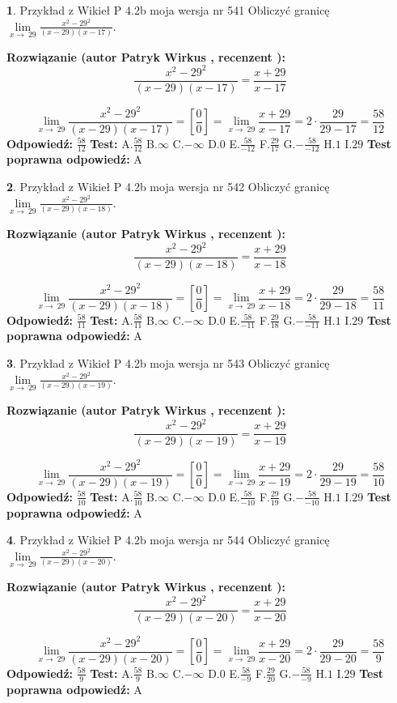 \documentclass[12pt, a4paper]{article}
\theoremstyle{definition} %
\newtheorem{zad}{}
\newcommand{\zadStart}[1]{\begin{zad}#1\newline}
\newcommand{\zadStop}{\end{zad}}
\newcommand{\rozwStart}[2]{\noindent \textbf{Rozwiązanie (autor #1 , recenzent #2): }\newline}
\newcommand{\rozwStop}{\newline}
\newcommand{\odpStart}{\noindent \textbf{Odpowiedź:}\newline}
\newcommand{\odpStop}{\newline}
\newcommand{\testStart}{\noindent \textbf{Test:}\newline}
\newcommand{\testStop}{\newline}
\newcommand{\kluczStart}{\noindent \textbf{Test poprawna odpowiedź:}\newline}
\newcommand{\kluczStop}{\newline}
\begin{document}
\zadStart{Przykład z Wikieł P 4.2b moja wersja nr 541}
Obliczyć granicę $\lim\limits_{x\to\ 29}\frac{x^{2}-29^{2}}{(x-29)(x-17)}$.
\zadStop
\rozwStart{Patryk Wirkus}{}
$$\frac{x^{2}-29^{2}}{(x-29)(x-17)}=\frac{x+29}{x-17}$$

$$\lim\limits_{x\to\ 29}\frac{x^{2}-29^{2}}{(x-29)(x-17)}=[\frac{0}{0}]=\lim\limits_{x\to\ 29}\frac{x+29}{x-17}=2 \cdot \frac{29}{29-17} = \frac{58}{12}$$
\rozwStop
\odpStart
$\frac{58}{12}$
\odpStop
\testStart
A.$\frac{58}{12}$
B.$\infty$
C.$-\infty$
D.$0$
E.$\frac{58}{-12}$
F.$\frac{29}{17}$
G.$-\frac{58}{-12}$
H.$1$
I.$29$
\testStop
\kluczStart
A
\kluczStop



\zadStart{Przykład z Wikieł P 4.2b moja wersja nr 542}
Obliczyć granicę $\lim\limits_{x\to\ 29}\frac{x^{2}-29^{2}}{(x-29)(x-18)}$.
\zadStop
\rozwStart{Patryk Wirkus}{}
$$\frac{x^{2}-29^{2}}{(x-29)(x-18)}=\frac{x+29}{x-18}$$

$$\lim\limits_{x\to\ 29}\frac{x^{2}-29^{2}}{(x-29)(x-18)}=[\frac{0}{0}]=\lim\limits_{x\to\ 29}\frac{x+29}{x-18}=2 \cdot \frac{29}{29-18} = \frac{58}{11}$$
\rozwStop
\odpStart
$\frac{58}{11}$
\odpStop
\testStart
A.$\frac{58}{11}$
B.$\infty$
C.$-\infty$
D.$0$
E.$\frac{58}{-11}$
F.$\frac{29}{18}$
G.$-\frac{58}{-11}$
H.$1$
I.$29$
\testStop
\kluczStart
A
\kluczStop



\zadStart{Przykład z Wikieł P 4.2b moja wersja nr 543}
Obliczyć granicę $\lim\limits_{x\to\ 29}\frac{x^{2}-29^{2}}{(x-29)(x-19)}$.
\zadStop
\rozwStart{Patryk Wirkus}{}
$$\frac{x^{2}-29^{2}}{(x-29)(x-19)}=\frac{x+29}{x-19}$$

$$\lim\limits_{x\to\ 29}\frac{x^{2}-29^{2}}{(x-29)(x-19)}=[\frac{0}{0}]=\lim\limits_{x\to\ 29}\frac{x+29}{x-19}=2 \cdot \frac{29}{29-19} = \frac{58}{10}$$
\rozwStop
\odpStart
$\frac{58}{10}$
\odpStop
\testStart
A.$\frac{58}{10}$
B.$\infty$
C.$-\infty$
D.$0$
E.$\frac{58}{-10}$
F.$\frac{29}{19}$
G.$-\frac{58}{-10}$
H.$1$
I.$29$
\testStop
\kluczStart
A
\kluczStop



\zadStart{Przykład z Wikieł P 4.2b moja wersja nr 544}
Obliczyć granicę $\lim\limits_{x\to\ 29}\frac{x^{2}-29^{2}}{(x-29)(x-20)}$.
\zadStop
\rozwStart{Patryk Wirkus}{}
$$\frac{x^{2}-29^{2}}{(x-29)(x-20)}=\frac{x+29}{x-20}$$

$$\lim\limits_{x\to\ 29}\frac{x^{2}-29^{2}}{(x-29)(x-20)}=[\frac{0}{0}]=\lim\limits_{x\to\ 29}\frac{x+29}{x-20}=2 \cdot \frac{29}{29-20} = \frac{58}{9}$$
\rozwStop
\odpStart
$\frac{58}{9}$
\odpStop
\testStart
A.$\frac{58}{9}$
B.$\infty$
C.$-\infty$
D.$0$
E.$\frac{58}{-9}$
F.$\frac{29}{20}$
G.$-\frac{58}{-9}$
H.$1$
I.$29$
\testStop
\kluczStart
A
\kluczStop
\end{document}
